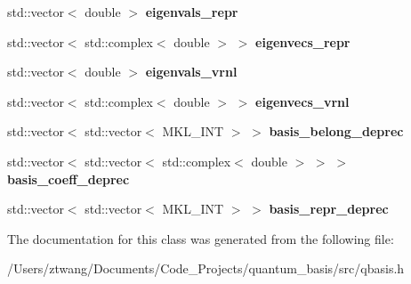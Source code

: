 \begin{DoxyCompactItemize}
\item 
\mbox{\label{classqbasis_1_1model_ab1702fa29618ab76676f106c38918144}} 
std\+::vector$<$ double $>$ {\bfseries eigenvals\+\_\+repr}
\item 
\mbox{\label{classqbasis_1_1model_aa0f6f09ae068c02eaa6c336cdaca1bf2}} 
std\+::vector$<$ std\+::complex$<$ double $>$ $>$ {\bfseries eigenvecs\+\_\+repr}
\item 
\mbox{\label{classqbasis_1_1model_a9533140bb323da075979f56f0a53aafb}} 
std\+::vector$<$ double $>$ {\bfseries eigenvals\+\_\+vrnl}
\item 
\mbox{\label{classqbasis_1_1model_a1e092112065713e5e3591bb08c429844}} 
std\+::vector$<$ std\+::complex$<$ double $>$ $>$ {\bfseries eigenvecs\+\_\+vrnl}
\item 
\mbox{\label{classqbasis_1_1model_a6a3f7a607b57f7f4afe528faaeaf4ed8}} 
std\+::vector$<$ std\+::vector$<$ M\+K\+L\+\_\+\+I\+NT $>$ $>$ {\bfseries basis\+\_\+belong\+\_\+deprec}
\item 
\mbox{\label{classqbasis_1_1model_ae93de7faabeb00fdb1e0d960a45a06d7}} 
std\+::vector$<$ std\+::vector$<$ std\+::complex$<$ double $>$ $>$ $>$ {\bfseries basis\+\_\+coeff\+\_\+deprec}
\item 
\mbox{\label{classqbasis_1_1model_ab7a6eec75cb690401014631408bf5699}} 
std\+::vector$<$ std\+::vector$<$ M\+K\+L\+\_\+\+I\+NT $>$ $>$ {\bfseries basis\+\_\+repr\+\_\+deprec}
\end{DoxyCompactItemize}


The documentation for this class was generated from the following file\+:\begin{DoxyCompactItemize}
\item 
/\+Users/ztwang/\+Documents/\+Code\+\_\+\+Projects/quantum\+\_\+basis/src/qbasis.\+h\end{DoxyCompactItemize}
